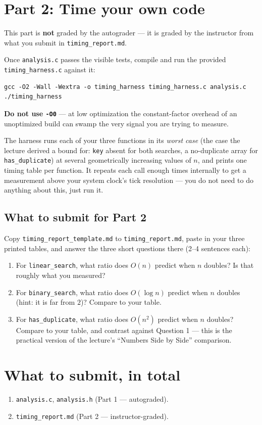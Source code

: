 \documentclass[11pt]{article}
\begin{document}
\section{Part 2: Time your own code}

This part is \textbf{not} graded by the autograder --- it is graded by the instructor from what you submit in \texttt{timing\_report.md}.

Once \texttt{analysis.c} passes the visible tests, compile and run the provided \texttt{timing\_harness.c} against it:

\begin{verbatim}
gcc -O2 -Wall -Wextra -o timing_harness timing_harness.c analysis.c
./timing_harness
\end{verbatim}

\noindent\textbf{Do not use \texttt{-O0}} --- at low optimization the constant-factor overhead of an unoptimized build can swamp the very signal you are trying to measure.

The harness runs each of your three functions in its \emph{worst case} (the case the lecture derived a bound for: \texttt{key} absent for both searches, a no-duplicate array for \texttt{has\_duplicate}) at several geometrically increasing values of $n$, and prints one timing table per function. It repeats each call enough times internally to get a measurement above your system clock's tick resolution --- you do not need to do anything about this, just run it.

\subsection{What to submit for Part 2}

Copy \texttt{timing\_report\_template.md} to \texttt{timing\_report.md}, paste in your three printed tables, and answer the three short questions there (2--4 sentences each):

\begin{enumerate}
  \item For \texttt{linear\_search}, what ratio does $O(n)$ predict when $n$ doubles? Is that roughly what you measured?
  \item For \texttt{binary\_search}, what ratio does $O(\log n)$ predict when $n$ doubles (hint: it is far from $2$)? Compare to your table.
  \item For \texttt{has\_duplicate}, what ratio does $O(n^2)$ predict when $n$ doubles? Compare to your table, and contrast against Question 1 --- this is the practical version of the lecture's ``Numbers Side by Side'' comparison.
\end{enumerate}

\section{What to submit, in total}

\begin{enumerate}
  \item \texttt{analysis.c}, \texttt{analysis.h} (Part 1 --- autograded).
  \item \texttt{timing\_report.md} (Part 2 --- instructor-graded).
\end{enumerate}
\end{document}
